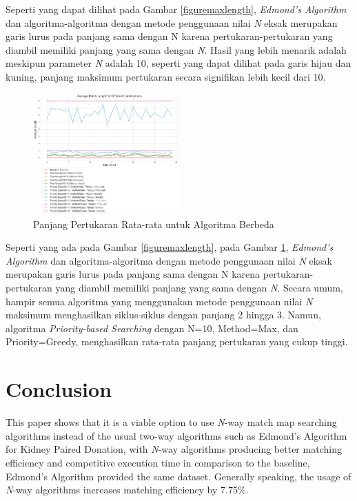 \documentclass[conference]{IEEEtran}
\begin{document}
Seperti yang dapat dilihat pada Gambar \ref{figuremaxlength}, \textit{Edmond's Algorithm} dan algoritma-algoritma dengan metode
penggunaan nilai \textit{N} eksak merupakan garis lurus pada panjang sama dengan N karena pertukaran-pertukaran yang diambil memiliki
panjang yang sama dengan \textit{N}. Hasil yang lebih menarik adalah meskipun parameter \textit{N} adalah 10, seperti yang dapat
dilihat pada garis hijau dan kuning, panjang maksimum pertukaran secara signifikan lebih kecil dari 10.

\begin{figure}[h]
    \includegraphics[width=0.5\textwidth]{images/average_match_length_for_different_combinations.png}
    \caption{Panjang Pertukaran Rata-rata untuk Algoritma Berbeda}
    \label{figureavglength}
\end{figure}

Seperti yang ada pada Gambar \ref{figuremaxlength}, pada Gambar \ref{figureavglength}, \textit{Edmond's Algorithm} dan algoritma-algoritma
dengan metode penggunaan nilai \textit{N} eksak merupakan garis lurus pada panjang sama dengan N karena pertukaran-pertukaran yang diambil
memiliki panjang yang sama dengan \textit{N}. Secara umum, hampir semua algoritma yang menggunakan metode penggunaan nilai \textit{N} maksimum
menghasilkan siklus-siklus dengan panjang 2 hingga 3. Namun, algoritma \textit{Priority-based Searching} dengan N=10, Method=Max, dan
Priority=Greedy, menghasilkan rata-rata panjang pertukaran yang cukup tinggi.

\section{Conclusion}
This paper shows that it is a viable option to use \textit{N}-way match map searching algorithms instead of the usual two-way
algorithms such as Edmond's Algorithm for Kidney Paired Donation, with \textit{N}-way algorithms producing better matching efficiency
and competitive execution time in comparison to the baseline, Edmond's Algorithm provided the same dataset. Generally speaking,
the usage of \textit{N}-way algorithms increases matching efficiency by 7.75\%.
\end{document}
